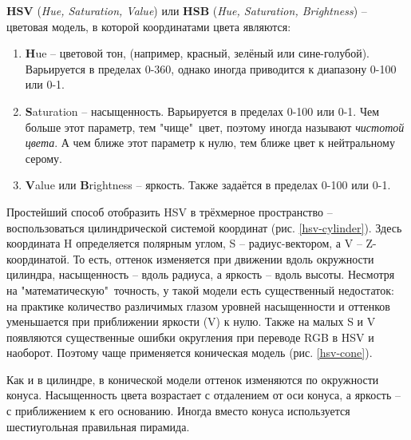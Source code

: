 {\bf HSV} ({\it Hue, Saturation, Value}) или {\bf HSB} ({\it Hue, Saturation, Brightness}) --
цветовая модель, в которой координатами цвета являются:
\begin{enumerate}
	\item {\bf H}ue -- цветовой тон, (например, красный, зелёный или сине-голубой). Варьируется 
в пределах 0-360\textdegree, однако иногда приводится к диапазону 0-100 или 0-1.
	\item {\bf S}aturation -- насыщенность. Варьируется в пределах 0-100 или 0-1. Чем больше
этот параметр, тем "чище"\ цвет, поэтому иногда называют {\it чистотой цвета}. А чем ближе этот
параметр к нулю, тем ближе цвет к нейтральному серому.
	\item {\bf V}alue или {\bf B}rightness -- яркость. Также задаётся в пределах 0-100 или 0-1.
\end{enumerate}

Простейший способ отобразить HSV в трёхмерное пространство -- воспользоваться цилиндрической
системой координат (рис. \ref{hsv-cylinder}). 
Здесь координата H определяется полярным углом, S -- радиус-вектором, а V --
Z-координатой. То есть, оттенок изменяется при движении вдоль окружности цилиндра, насыщенность 
-- вдоль радиуса, а яркость -- вдоль высоты. Несмотря на "математическую"\ точность, у такой
модели есть существенный недостаток: на практике количество различимых глазом уровней 
насыщенности и оттенков уменьшается при приближении яркости (V) к нулю. Также на малых S и V 
появляются существенные ошибки округления при переводе RGB в HSV и наоборот. Поэтому чаще
применяется коническая модель (рис. \ref{hsv-cone}).


Как и в цилиндре, в конической модели оттенок изменяются по окружности конуса. Насыщенность 
цвета возрастает с отдалением от оси конуса, а яркость -- с приближением к его основанию. Иногда
вместо конуса используется шестиугольная правильная пирамида.


